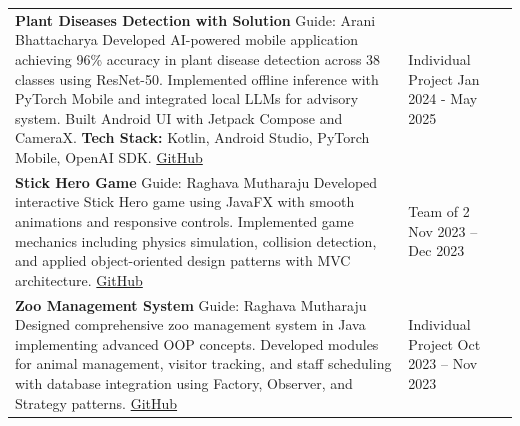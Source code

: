 \documentclass[10pt]{extarticle}
\begin{document}
\begin{contained}
\begin{longtable}{p{}p{}p{}}
    \textbf{Plant Diseases Detection with Solution} \newline
    Guide: Arani Bhattacharya \newline
    Developed AI-powered mobile application achieving 96\% accuracy in plant disease detection across 38 classes using ResNet-50. Implemented offline inference with PyTorch Mobile and integrated local LLMs for advisory system. Built Android UI with Jetpack Compose and CameraX.
    \newline \textbf{Tech Stack:} Kotlin, Android Studio, PyTorch Mobile, OpenAI SDK. \newline
    \href{https://github.com/Himanshu8368/MC_project}{GitHub} &
    Individual Project \newline Jan 2024 - May 2025\\
    \vspace{-34pt}
    \textbf{Stick Hero Game} \newline
    Guide: Raghava Mutharaju \newline
    Developed interactive Stick Hero game using JavaFX with smooth animations and responsive controls. Implemented game mechanics including physics simulation, collision detection, and applied object-oriented design patterns with MVC architecture.
    \newline \href{https://github.com/Himanshu8368/Ap-Project}{GitHub} &
    Team of 2 \newline Nov 2023 – Dec 2023\\

    \textbf{Zoo Management System} \newline
    Guide: Raghava Mutharaju \newline
    Designed comprehensive zoo management system in Java implementing advanced OOP concepts. Developed modules for animal management, visitor tracking, and staff scheduling with database integration using Factory, Observer, and Strategy patterns.
    \newline \href{https://github.com/yourusername/zoo-management}{GitHub} &
    Individual Project \newline Oct 2023 – Nov 2023\\
\end{longtable}
\end{contained}
\end{document}
